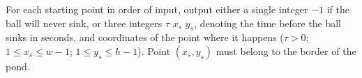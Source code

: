 For each starting point in order of input, output either a single integer $-1$ if the ball will never sink, or three integers $\tau$ $x_s$ $y_s$, denoting the time before the ball sinks in seconds, and coordinates of the point where it happens ($\tau > 0$; $1 \le x_s \le w - 1$; $1 \le y_s \le h - 1$). Point $(x_s, y_s)$ must belong to the border of the pond.